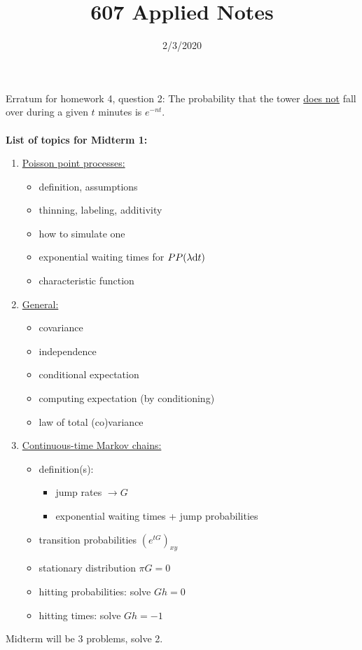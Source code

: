 \documentclass{article}
\title{607 Applied Notes}
\date{2/3/2020}
\theoremstyle{definition}
\begin{document}
\maketitle
Erratum for homework 4, question 2: The probability that the tower \underline{does not} fall over during a given $t$ minutes is $e^{-nt}$.\\\\

\Large
\noindent \textbf{List of topics for Midterm 1:}\normalsize
\begin{enumerate}
    \item \underline{Poisson point processes:}
    \begin{itemize}
        \item definition, assumptions
        \item thinning, labeling, additivity
        \item how to simulate one
        \item exponential waiting times for $PP(\lambda \text dt)$
        \item characteristic function
    \end{itemize}
    \item \underline{General:}
    \begin{itemize}
        \item covariance
        \item independence
        \item conditional expectation
        \item computing expectation (by conditioning)
        \item law of total (co)variance
    \end{itemize}
    \item \underline{Continuous-time Markov chains:}
    \begin{itemize}
        \item definition(s):
        \begin{itemize}
            \item jump rates $\xrightarrow{} G$
            \item exponential waiting times + jump probabilities
        \end{itemize}
        \item transition probabilities $\left(e^{tG}\right)_{xy}$
        \item stationary distribution $\pi G = 0$
        \item hitting probabilities: solve $Gh = 0$
        \item hitting times: solve $Gh = -1$
    \end{itemize}
\end{enumerate}
Midterm will be 3 problems, solve 2.\\
\end{document}
